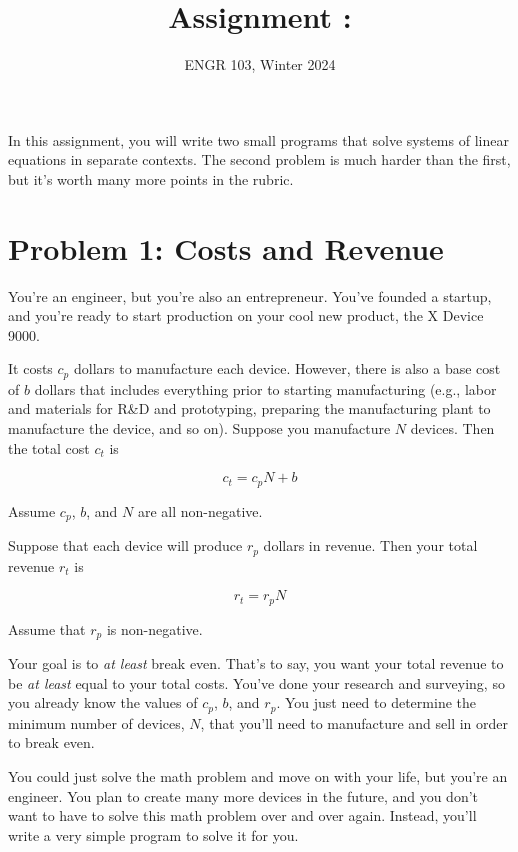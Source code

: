 \documentclass{article}
\title{
    Assignment \assignmentnumber: \assignmenttitle
}
\author{ENGR 103, Winter 2024}
\date{}
\begin{document}
\maketitle

In this assignment, you will write two small programs that solve systems of linear equations in separate contexts. The second problem is much harder than the first, but it's worth many more points in the rubric.

\section{Problem 1: Costs and Revenue}

You're an engineer, but you're also an entrepreneur. You've founded a startup, and you're ready to start production on your cool new product, the X Device 9000.

It costs $c_p$ dollars to manufacture each device. However, there is also a base cost of $b$ dollars that includes everything prior to starting manufacturing (e.g., labor and materials for R\&D and prototyping, preparing the manufacturing plant to manufacture the device, and so on). Suppose you manufacture $N$ devices. Then the total cost $c_t$ is

\begin{equation}
    c_t = c_pN + b
\end{equation}

Assume $c_p$, $b$, and $N$ are all non-negative.

Suppose that each device will produce $r_p$ dollars in revenue. Then your total revenue $r_t$ is

\begin{equation}
    r_t = r_pN
\end{equation}

Assume that $r_p$ is non-negative.

Your goal is to \textit{at least} break even. That's to say, you want your total revenue to be \textit{at least} equal to your total costs. You've done your research and surveying, so you already know the values of $c_p$, $b$, and $r_p$. You just need to determine the minimum number of devices, $N$, that you'll need to manufacture and sell in order to break even.

You could just solve the math problem and move on with your life, but you're an engineer. You plan to create many more devices in the future, and you don't want to have to solve this math problem over and over again. Instead, you'll write a very simple program to solve it for you.
\end{document}
